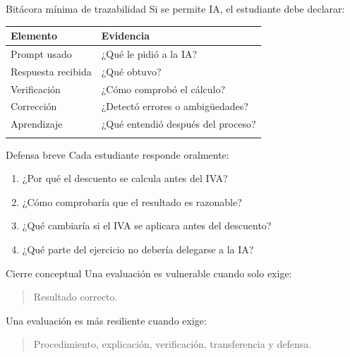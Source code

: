 \documentclass[
  ignorenonframetext,
  aspectratio=169,
  spanish,
]{beamer}
\newcounter{none} %
\providecommand{\tightlist}{%
  \setlength{\itemsep}{0pt}\setlength{\parskip}{0pt}}
\begin{document}
\begin{frame}{Bitácora mínima de trazabilidad}
\protect{}\label{bituxe1cora-muxednima-de-trazabilidad}
Si se permite IA, el estudiante debe declarar:

{\def\LTcaptype{none} %
\begin{longtable}[]{@{}ll@{}}
\toprule\noalign{}
Elemento & Evidencia \\
\midrule\noalign{}
\endhead
Prompt usado & ¿Qué le pidió a la IA? \\
Respuesta recibida & ¿Qué obtuvo? \\
Verificación & ¿Cómo comprobó el cálculo? \\
Corrección & ¿Detectó errores o ambigüedades? \\
Aprendizaje & ¿Qué entendió después del proceso? \\
\bottomrule\noalign{}
\end{longtable}
}
\end{frame}

\begin{frame}{Defensa breve}
\protect{}\label{defensa-breve}
Cada estudiante responde oralmente:

\begin{enumerate}
\tightlist
\item
  ¿Por qué el descuento se calcula antes del IVA?
\item
  ¿Cómo comprobaría que el resultado es razonable?
\item
  ¿Qué cambiaría si el IVA se aplicara antes del descuento?
\item
  ¿Qué parte del ejercicio no debería delegarse a la IA?
\end{enumerate}
\end{frame}

\begin{frame}{Cierre conceptual}
\protect{}\label{cierre-conceptual}
Una evaluación es vulnerable cuando solo exige:

\begin{quote}
Resultado correcto.
\end{quote}

Una evaluación es más resiliente cuando exige:

\begin{quote}
Procedimiento, explicación, verificación, transferencia y defensa.
\end{quote}
\end{frame}
\end{document}
